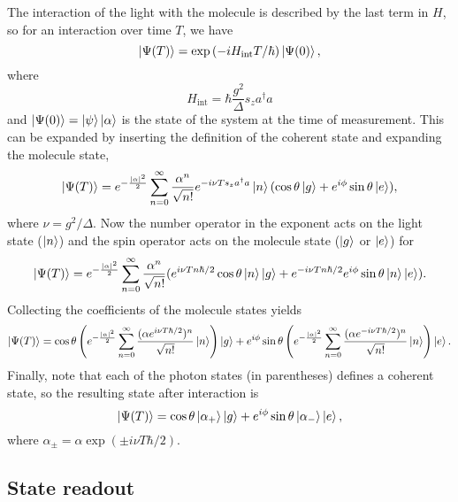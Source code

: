 The interaction of the light with the molecule is described by the last term in
$H$, so for an interaction over time $T$, we have
%
\begin{equation}
  \ket{\Psi(T)} = \exp\left(-iH_\text{int}T/\hbar\right)\ket{\Psi(0)},
\end{equation}
%
where
%
\begin{equation}
  H_\text{int} = \hbar \frac{g^2}{\Delta} s_z a^\dagger a
\end{equation}
%
and $\ket{\Psi(0)} = \ket{\psi}\ket{\alpha}$ is the state of the system at the
time of measurement. This can be expanded by inserting the definition of the
coherent state and expanding the molecule state,
%
\begin{equation}
  \ket{\Psi(T)} = e^{-\frac{|\alpha|^2}{2}}\sum_{n=0}^\infty
   \frac{\alpha^n}{\sqrt{n!}} e^{-i\nu T s_z a^\dagger a} \ket{n} (\cos\theta
   \ket{g} + e^{i\phi}\sin\theta\ket{e}),
   \label{mws:eqn:evolve1}
\end{equation}
%
where $\nu = g^2/\Delta$.
Now the number operator in the exponent acts on the light state ($\ket{n}$) and
the spin operator acts on the molecule state ($\ket{g}$ or $\ket{e}$) for
%
\begin{equation}
   \ket{\Psi(T)} = e^{-\frac{|\alpha|^2}{2}}\sum_{n=0}^\infty
   \frac{\alpha^n}{\sqrt{n!}} (e^{i\nu T n \hbar/2}\cos\theta\ket{n}\ket{g} +
   e^{-i\nu T n \hbar/2}e^{i\phi}\sin\theta\ket{n}\ket{e}).
\end{equation}
%
Collecting the coefficients of the molecule states yields
%
\begin{equation}
  \ket{\Psi(T)} = \cos\theta\left(e^{-\frac{|\alpha|^2}{2}}\sum_{n=0}^\infty
   \frac{(\alpha e^{i\nu T \hbar/2})^n}{\sqrt{n!}}\ket{n}\right)\ket{g} +  
    e^{i\phi}\sin\theta\left(e^{-\frac{|\alpha|^2}{2}}\sum_{n=0}^\infty
   \frac{(\alpha e^{-i\nu T \hbar/2})^n}{\sqrt{n!}}\ket{n}\right)\ket{e}.
\end{equation}
%
Finally, note that each of the photon states (in parentheses) defines a
coherent state, so the resulting state after interaction is
%
\begin{equation}
  \ket{\Psi(T)} = \cos\theta\ket{\alpha_+}\ket{g} +
  e^{i\phi}\sin\theta\ket{\alpha_-}\ket{e},
  \label{mws:eqn:entangled}
\end{equation}
%
where $\alpha_\pm = \alpha \exp(\pm i \nu T \hbar/2)$.

\subsection{State readout}
\label{mws:readout}

